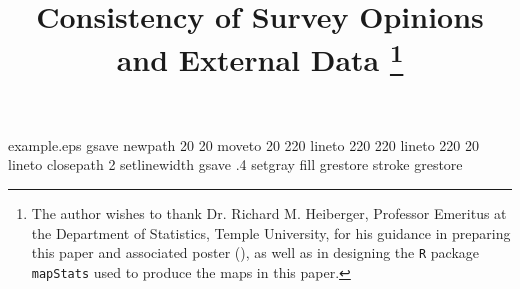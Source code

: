 %
%
%
%
%
\begin{filecontents*}{example.eps}
gsave
newpath
  20 20 moveto
  20 220 lineto
  220 220 lineto
  220 20 lineto
closepath
2 setlinewidth
gsave
  .4 setgray fill
grestore
stroke
grestore
\end{filecontents*}
%
\RequirePackage{fix-cm}
%
\documentclass[smallextended, hidelinks]{svjour3}       %
%
\smartqed  %
%
\usepackage{graphicx}
\setlength{\parindent}{15pt}
\usepackage{hyperref}
\usepackage{booktabs}%
\usepackage{caption}
\usepackage{multirow}
\captionsetup{justification=raggedright}
\usepackage[authoryear]{natbib}

%
%
%
%
%


\title{Consistency of Survey Opinions and External Data
\thanks{The author wishes to thank Dr. Richard M. Heiberger, Professor Emeritus at the Department of Statistics, Temple University, for his guidance in preparing this paper and associated poster (\citealt{poster}), as well as in designing the \texttt{R} package \texttt{mapStats} used to produce the maps in this paper.}
}

